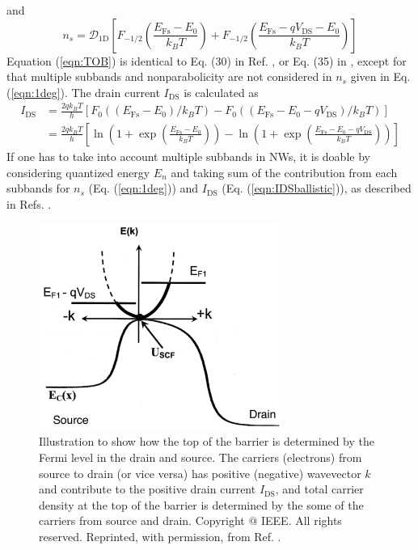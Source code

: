 \documentclass[11pt,uplatex,a4paper]{jsarticle}
\begin{document}
and
\begin{equation}
 n_s = \mathcal{D}_{\mathrm{1D}}
  \left[
   F_{-1/2}(\frac{E_{\mathrm{Fs}} - E_0}{k_B T})+
   F_{-1/2}(\frac{E_{\mathrm{Fs}} - q V_{\mathrm{DS}}- E_0}{k_B T})
												   \right]
  \label{eqn:1deg}
\end{equation}
Equation (\ref{eqn:TOB}) is identical to Eq. (30) in Ref. \cite{Lind}, or
Eq. (35) in \cite{Yu:2008tv}, except for that multiple subbands and
nonparabolicity are not considered in $n_s$ given in Eq. (\ref{eqn:1deg}).
The drain current $I_{\mathrm{DS}}$ is calculated as \cite{Lind,LG,Yu:2008tv}
\begin{align}
 I_{\mathrm{DS}} &=   \frac{2q k_B T}{h}
  \left[
   F_0\left((E_{\mathrm{Fs}}-E_{0})/k_B T\right)
-  F_0\left((E_{\mathrm{Fs}}-E_{0}-qV_{\mathrm{DS}})/k_B T\right)
							   \right] \\
&=  \frac{2q k_B T}{h}
  \left[\ln \left(1+ \exp \left(\frac{E_{\mathrm{Fs}}-E_{0}}{k_B T}\right)\right)
 -\ln \left(1+ \exp \left(\frac{E_{\mathrm{Fs}}-E_{0}-qV_{\mathrm{DS}}}{k_B T} \right)
 \right)
 \right]
 \label{eqn:IDSballistic}
\end{align}
If one has to take into account multiple subbands in NWs,
it is doable by considering quantized energy $E_n$ 
and taking sum of the contribution from each subbands for $n_s$ (Eq. (\ref{eqn:1deg}))
and $I_{\mathrm{DS}}$ (Eq. (\ref{eqn:IDSballistic})), as described in Refs. \cite{Lind,Yu:2008tv}.

\begin{figure}[htbp]
 \centering
 \includegraphics[keepaspectratio,width=8cm,bb=0 0 520 439]{TOB.pdf}
 \caption{Illustration to show how the top of the barrier is determined by the Fermi level in the
 drain and source.
 The carriers (electrons) from source to drain (or vice versa) has positive (negative) wavevector $k$ and contribute to the
 positive drain current $I_{\mathrm{DS}}$, and total carrier density at the
 top of the barrier is determined by the some of the carriers from source and drain.
 Copyright @ IEEE. All rights reserved. Reprinted, with permission, from Ref. .
 \label{fig:TOB}}
\end{figure}
\end{document}
